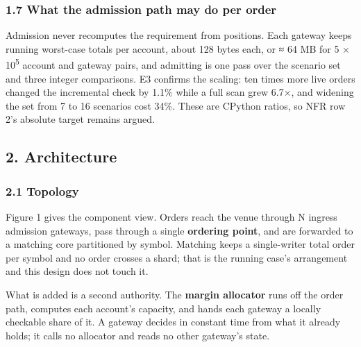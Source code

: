 \documentclass[10pt,a4paper]{article}
\begin{document}
\subsubsection{1.7 What the admission path may do per order}\label{what-the-admission-path-may-do-per-order}

Admission never recomputes the requirement from positions. Each gateway keeps
running worst-case totals per account, about 128 bytes each, or ≈ 64 MB for
5 × 10\textsuperscript{5} account and gateway pairs, and admitting is one pass over the scenario
set and three integer comparisons. E3 confirms the scaling: ten times more live
orders changed the incremental check by 1.1\% while a full scan grew 6.7×, and
widening the set from 7 to 16 scenarios cost 34\%. These are CPython ratios, so
NFR row 2's absolute target remains argued.



\label{start:2}%

\subsection{2. Architecture}\label{architecture}

\subsubsection{2.1 Topology}\label{topology}

Figure 1 gives the component view. Orders reach the venue through N ingress
admission gateways, pass through a single \textbf{ordering point}, and are forwarded
to a matching core partitioned by symbol. Matching keeps a single-writer total
order per symbol and no order crosses a shard; that is the running case's
arrangement and this design does not touch it.

What is added is a second authority. The \textbf{margin allocator} runs off the order
path, computes each account's capacity, and hands each gateway a locally
checkable share of it. A gateway decides in constant time from what it already
holds; it calls no allocator and reads no other gateway's state.
\end{document}
